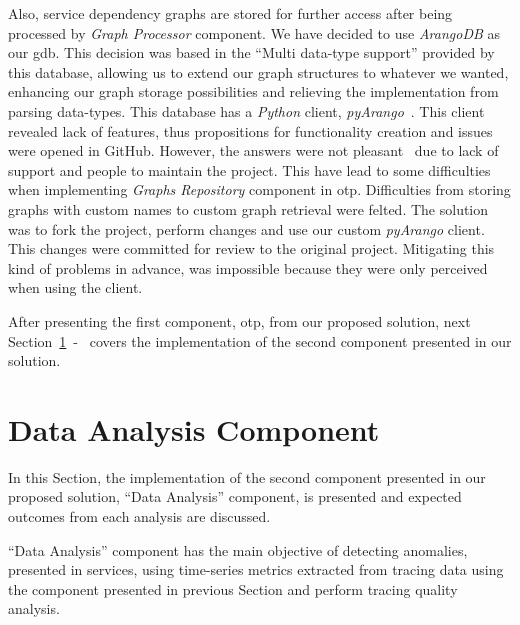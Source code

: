 Also, service dependency graphs are stored for further access after being processed by \emph{Graph Processor} component. We have decided to use \emph{ArangoDB} as our \gls{gdb}. This decision was based in the ``Multi data-type support'' provided by this database, allowing us to extend our graph structures to whatever we wanted, enhancing our graph storage possibilities and relieving the implementation from parsing data-types. This database has a \emph{Python} client, \emph{pyArango}~\cite{pyarango}. This client revealed lack of features, thus propositions for functionality creation and issues were opened in GitHub. However, the answers were not pleasant~\cite{arango_issues} due to lack of support and people to maintain the project. This have lead to some difficulties when implementing \emph{Graphs Repository} component in \gls{otp}. Difficulties from storing graphs with custom names to custom graph retrieval were felted. The solution was to fork the project, perform changes and use our custom \emph{pyArango} client. This changes were committed for review to the original project. Mitigating this kind of problems in advance, was impossible because they were only perceived when using the client.


After presenting the first component, \gls{otp}, from our proposed solution, next Section~\ref{sec:data_analysis_component}~-~ covers the implementation of the second component presented in our solution.

\section{Data Analysis Component}
\label{sec:data_analysis_component}

In this Section, the implementation of the second component presented in our proposed solution, ``Data Analysis'' component, is presented and expected outcomes from each analysis are discussed.

``Data Analysis'' component has the main objective of detecting anomalies, presented in services, using time-series metrics extracted from tracing data using the component presented in previous Section and perform tracing quality analysis.

